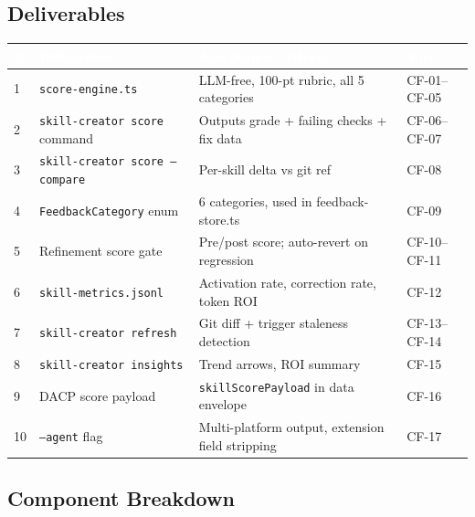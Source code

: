 \documentclass[11pt,letterpaper]{article}
\newcommand{\tableheader}[1]{\textbf{\sffamily\textcolor{white}{#1}}}
\begin{document}
\subsection{Deliverables}

\begin{center}
\begin{tabularx}{\textwidth}{C{0.5cm}L{4cm}XC{2.5cm}}
\toprule
{}
\tableheader{\#} & \tableheader{Deliverable} & \tableheader{Acceptance Criteria} & \tableheader{Spec} \\
 & \texttt{score-engine.ts} & LLM-free, 100-pt rubric, all 5 categories & CF-01--CF-05 \\
2 & \texttt{skill-creator score} command & Outputs grade + failing checks + fix data & CF-06--CF-07 \\
3 & \texttt{skill-creator score --compare} & Per-skill delta vs git ref & CF-08 \\
4 & \texttt{FeedbackCategory} enum & 6 categories, used in feedback-store.ts & CF-09 \\
5 & Refinement score gate & Pre/post score; auto-revert on regression & CF-10--CF-11 \\
6 & \texttt{skill-metrics.jsonl} & Activation rate, correction rate, token ROI & CF-12 \\
7 & \texttt{skill-creator refresh} & Git diff + trigger staleness detection & CF-13--CF-14 \\
8 & \texttt{skill-creator insights} & Trend arrows, ROI summary & CF-15 \\
9 & DACP score payload & \texttt{skillScorePayload} in data envelope & CF-16 \\
10 & \texttt{--agent} flag & Multi-platform output, extension field stripping & CF-17 \\
\bottomrule
\end{tabularx}
\end{center}

\subsection{Component Breakdown}
\end{document}
